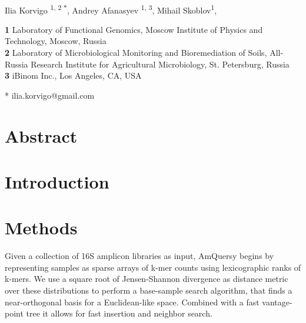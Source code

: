 \documentclass[10pt,letterpaper]{article}
\date{}
\begin{document}
\vspace*{0.2in}

\begin{flushleft}
{\Large
\textbf{} %
}
\newline
\\

Ilia Korvigo \textsuperscript{1, 2 $\ast$},
Andrey Afanasyev \textsuperscript{1, 3},
Mihail Skoblov\textsuperscript{1},

\bigskip
\textbf{1} Laboratory of Functional Genomics, Moscow Institute of Physics and Technology, Moscow, Russia
\\
\textbf{2}  Laboratory of Microbiological Monitoring and Bioremediation of Soils, All-Russia Research Institute for Agricultural Microbiology, St. Petersburg, Russia
\\
\textbf{3}  iBinom Inc., Los Angeles, CA, USA
\\
\bigskip

* ilia.korvigo@gmail.com

\end{flushleft}
\section*{Abstract}

\linenumbers

\section*{Introduction}
	

\section*{Methods}
	Given a collection of 16S amplicon libraries as input, AmQuersy 
	begins by representing samples as sparse arrays of k-mer counts using
	lexicographic ranks of k-mers. We use a square root of Jensen-Shannon 
	divergence as distance metric over these distributions to perform a
	base-sample search algorithm, that finds a near-orthogonal basis for
	a Euclidean-like space. Combined with a fast vantage-point tree it allows 
	for fast insertion and neighbor search.
\end{document}
